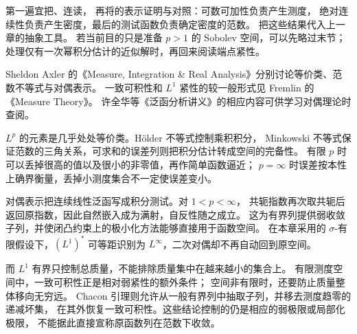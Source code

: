 \ProseParagraphBreak

第一遍宜把、连读，
再将的表示证明与对照：可数可加性负责产生测度，
绝对连续性负责产生密度，最后的测试函数负责确定密度的范数。
把这些结果代入上一章的抽象工具。
若当前目的只是准备 \(p>1\) 的 Sobolev 空间，可以先略过末节；
处理仅有一次幂积分估计的近似解时，再回来阅读端点紧性。

\ProseParagraphBreak

Sheldon Axler 的《Measure, Integration \& Real Analysis》\cite[Chapter 7; 9.42 dual space of \(L^p(\mu)\) is \(L^{p'}(\mu)\)]{Axler2020Measure}分别讨论等价类、范数不等式与对偶表示。
一致可积性和 \(L^1\) 紧性的较一般形式见 Fremlin 的《Measure Theory》\cite[Volume 2, \S\S246--247]{Fremlin2016Measure}。
许全华等《泛函分析讲义》\cite[第9.5节]{Xu2017Fanhan}的相应内容可供学习对偶理论时查阅。






\begin{chaptersummary}
\(L^p\) 的元素是几乎处处等价类。Hölder 不等式控制乘积积分，
Minkowski 不等式保证范数的三角关系，可求和的误差列则把积分估计转成空间的完备性。
有限 \(p\) 时可以丢掉很高的值以及很小的非零值，再作简单函数逼近；
\(p=\infty\) 时误差按本性上确界衡量，丢掉小测度集合不一定使误差变小。

\ProseParagraphBreak

对偶表示把连续线性泛函写成积分测试。对 \(1<p<\infty\)，
共轭指数再次取共轭后返回原指数，因此自然嵌入成为满射，自反性随之成立。
这为有界列提供弱收敛子列，并使闭凸约束上的极小化方法能够直接用于函数空间。
在本章采用的 \(\sigma\)-有限假设下，\((L^1)^*\) 可等距识别为 \(L^\infty\)，二次对偶却不再自动回到原空间。

\ProseParagraphBreak

而 \(L^1\) 有界只控制总质量，不能排除质量集中在越来越小的集合上。
有限测度空间中，一致可积性正是相对弱紧性的额外条件；
空间非有限时，还要防止质量整体移向无穷远。
Chacon 引理则允许从一般有界列中抽取子列，并移去测度趋零的递减坏集，
在其外恢复一致可积性。这些结论控制的仍是相应的弱极限或局部化极限，
不能据此直接宣称原函数列在范数下收敛。
\end{chaptersummary}


\BookExercises


